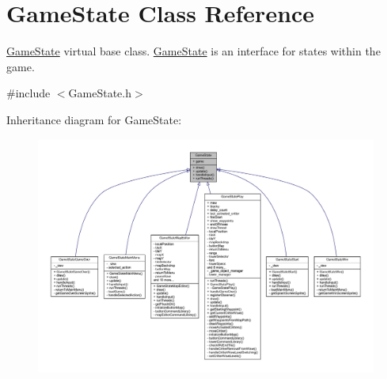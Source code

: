 \hypertarget{class_game_state}{\section{Game\+State Class Reference}
\label{class_game_state}
}


\hyperlink{class_game_state}{Game\+State} virtual base class. \hyperlink{class_game_state}{Game\+State} is an interface for states within the game.  




{\ttfamily \#include $<$Game\+State.\+h$>$}



Inheritance diagram for Game\+State\+:
\nopagebreak
\begin{figure}[H]
\begin{center}
\leavevmode
\includegraphics[width=350pt]{class_game_state__inherit__graph}
\end{center}
\end{figure}


